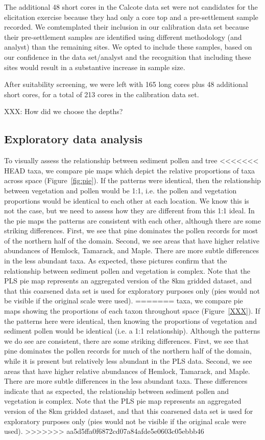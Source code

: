 \documentclass[12pt]{article}
\begin{document}
The additional 48 short cores in the Calcote data set were not candidates for
the elicitation exercise because they had only a core top and a
pre-settlement sample recorded. We comtemplated their inclusion in our
calibration data set because their pre-settlement samples are
identified using different methodology (and analyst) than the
remaining sites. We opted to include these samples, based on our
confidence in the data set/analyst and the recognition that including
these sites would result in a substantive increase in sample size.

After suitability screening, we were left with 165 long cores plus 48
additional short cores, for a total of 213 cores in the calibration data set.

XXX: How did we choose the depths?

\subsection{Exploratory data analysis}

To visually assess the relationship between sediment pollen and tree
<<<<<<< HEAD
taxa, we compare pie maps which depict the relative proportions of
taxa across space (Figure~\ref{fig:pie}). If the patterns were
identical, then the relationship between vegetation and pollen would
be 1:1, i.e. the pollen and vegetation proportions would be identical
to each other at each location. We know this is not the case, but we
need to assess how they are different from this 1:1 ideal. In the pie
maps the patterns are consistent with each other, although there are
some striking differences. First, we see that pine dominates the
pollen records for most of the northern half of the domain. Second, we
see areas that have higher relative abundances of Hemlock, Tamarack,
and Maple. There are more subtle differences in the less abundant
taxa. As expected, these pictures confirm that the relationship
between sediment pollen and vegetation is complex. Note that the PLS
pie map represents an aggregated version of the 8km gridded dataset,
and that this coarsened data set is used for exploratory purposes only
(pies would not be visible if the original scale were used).
=======
taxa, we compare pie maps showing the proportions of each taxon
throughout space (Figure~\ref{XXX}). If the patterns here were
identical, then knowing the proportions of vegetation and sediment
pollen would be identical (i.e. a 1:1 relationship). Although the
patterns we do see are consistent, there are some striking
differences. First, we see that pine dominates the pollen records for
much of the northern half of the domain, while it is present but
relatively less abundant in the PLS data. Second, we see areas that
have higher relative abundances of Hemlock, Tamarack, and Maple. There
are more subtle differences in the less abundant taxa. These
differences indicate that as expected, the relationship between
sediment pollen and vegetation is complex. Note that the PLS pie map
represents an aggregated version of the 8km gridded dataset, and that
this coarsened data set is used for exploratory purposes only (pies
would not be visible if the original scale were used).
>>>>>>> aa5d5ffa0f6872cd07a84afde5e0603c05ebbb46
\end{document}
